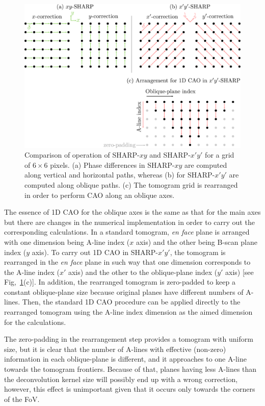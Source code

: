 \begin{figure}[htb!]
	\centering
	\includegraphics[width=\textwidth]{Figures/SHARP/SHARP45d_Diagram.pdf}
	\caption[Comparison of operation of SHARP-$xy$ and SHARP-$x'y'$.]{Comparison of operation of SHARP-$xy$ and SHARP-$x'y'$ for a grid of $6\times 6$ pixels. (a) Phase differences in SHARP-$xy$ are computed along vertical and horizontal paths, whereas (b) for SHARP-$x'y'$ are computed along oblique paths. (c) The tomogram grid is rearranged in order to perform CAO along an oblique axes.}
	\label{fig:SHARP45d_Diag}
\end{figure}

The essence of 1D CAO for the oblique axes is the same as that for the main axes but there are changes in the numerical implementation in order to carry out the corresponding calculations.  In a standard tomogram, \textit{en face} plane is arranged with one dimension being A-line index ($x$ axis) and the other being B-scan plane index ($y$ axis). To carry out 1D CAO in SHARP-$x'y'$, the tomogram is rearranged in the \textit{en face} plane in such way that one dimension corresponds to the A-line index ($x'$ axis) and the other to the oblique-plane index ($y'$ axis) [see Fig,~\ref{fig:SHARP45d_Diag}(c)]. In addition, the rearranged tomogram is zero-padded to keep a constant oblique-plane size because original planes have different numbers of A-lines. Then, the standard 1D CAO procedure can be applied directly to the rearranged tomogram using the A-line index dimension as the aimed dimension for the calculations.

The zero-padding in the rearrangement step provides a tomogram with uniform size, but it is clear that the number of A-lines with effective (non-zero) information in each oblique-plane is different, and it approaches to one A-line towards the tomogram frontiers. Because of that, planes having less A-lines than the deconvolution kernel size will possibly end up with a wrong correction, however, this effect is unimportant given that it occurs only towards the corners  of the FoV.


